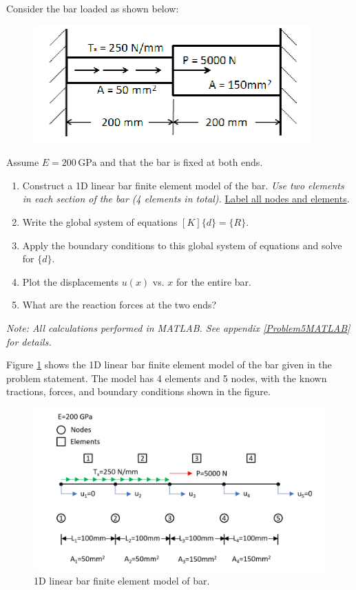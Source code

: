 \documentclass[../main.tex]{subfiles}
\begin{document}

Consider the bar loaded as shown below:

\begin{figure}[h!]
    \centering
    \includegraphics[scale=0.9]{../../images/problem_5/setup}
\end{figure}

Assume \(E=200\,\unit{\giga\pascal}\) and that the bar is fixed at both ends.

\begin{enumerate}[label=\alph*)]
    \item Construct a 1D linear bar finite element model of the bar. \textit{Use two elements in each section of the bar (4 elements in total).} \underline{Label all nodes and elements}.
    \item Write the global system of equations \([K]\{d\} = \{R\}\).
    \item Apply the boundary conditions to this global system of equations and solve for \(\{d\}\).
    \item Plot the displacements \(u(x)\) vs. \(x\) for the entire bar.
    \item What are the reaction forces at the two ends?
\end{enumerate}

\textit{Note: All calculations performed in MATLAB. See appendix \ref{Problem5MATLAB} for details.}


Figure \ref{fea_bar} shows the 1D linear bar finite element model of the bar given in the problem statement.
The model has 4 elements and 5 nodes, with the known tractions, forces, and boundary conditions shown in the figure.

\begin{figure}[h!]
    \centering
    \includegraphics[scale=0.45]{../../images/problem_5/5elementbar.png}
    \caption{1D linear bar finite element model of bar.}
    \label{fea_bar}
\end{figure}
\end{document}
